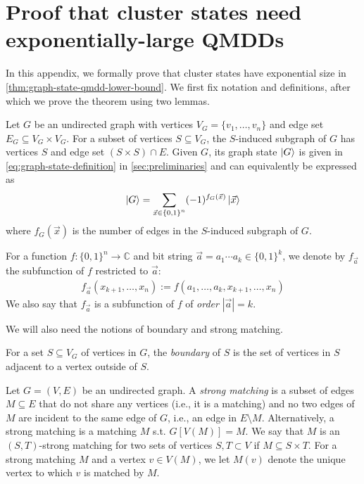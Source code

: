 
\newpage
\section{Proof that cluster states need exponentially-large QMDDs}
\label{sec:graph-state-lower-bound}


In this appendix, we formally prove that cluster states have exponential size in \qmdds \autoref{thm:graph-state-qmdd-lower-bound}.
We first fix notation and definitions, after which we prove 
the theorem using two lemmas.

Let $G$ be an undirected graph with vertices $V_G=\{v_1, \dots, v_n\}$ and edge set $E_G \subseteq V_G\times V_G$.
For a subset of vertices $S\subseteq V_G$, the $S$-induced subgraph of $G$ has vertices $S$ and edge set $(S \times S) \cap E$.
Given $G$, its graph state $\ket{G}$ is given in \autoref{eq:graph-state-definition} in \autoref{sec:preliminaries} and can equivalently be expressed as
\[
    \ket{G} = \sum_{\vec x\in \left\lbrace 0,1 \right\rbrace^n} (-1)^{f_G(\vec x) } \ket{\vec x}
\]
where $f_G(\vec{x})$ is the number of edges in the $S$-induced subgraph of $G$.

For a function $f: \{0, 1\}^n \rightarrow \mathbb{C}$ and bit string $\vec a=a_1\cdots a_k\in\{0, 1\}^k$, we denote by $f_{\vec{a}}$ the subfunction of $f$ restricted to $\vec a$:
\begin{align}
f_{\vec a}(x_{k+1},\ldots, x_n) := f(a_1,\ldots, a_k,x_{k+1},\ldots, x_n)
\end{align}
We also say that $f_{\vec a}$ is a subfunction of $f$ of \emph{order} $|\vec a|=k$.

We will also need the notions of boundary and strong matching.

\begin{definition}[Boundary]
	For a set $S\subseteq V_G$ of vertices in $G$, the \emph{boundary} of $S$ is the set of vertices in $S$ adjacent to a vertex outside of $S$.
\end{definition}

\begin{definition}\label{def:smatch}
	Let $G=(V,E)$ be an undirected graph. A \emph{strong matching} is a
	subset of edges $M \subseteq E$ that do not share any vertices (i.e., it is a matching)
	and no two edges of $M$ are incident to the same edge of $G$, i.e.,
	an edge in $E \setminus M$. Alternatively, a strong matching is a matching $M$ s.t. $G[V(M)] = M$.
	We say that $M$ is an $(S,T)$-strong matching for two sets of vertices $S,T\subset V$ if $M\subseteq S\times T$.
	For a strong matching $M$ and a vertex $v\in V(M)$, we let $M(v)$ denote the unique vertex to which $v$ is matched by $M$.
\end{definition}



